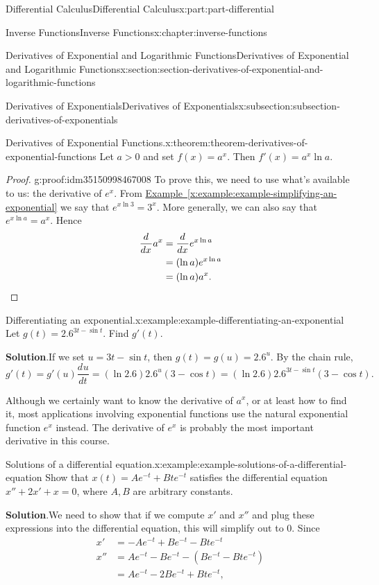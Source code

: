 \documentclass[twoside,10pt,]{book}
\newcommand{\blocktitlefont}{\relax}
\newcommand{\xreffont}{\relax}
\numberwithin{equation}{part}
\newcommand{\qedhere}{\relax}
\newcommand{\dv}[3][]{\dfrac{d^{#1} #2}{d #3^{#1}}}
\begin{document}
\begin{partptx}{Differential Calculus}{}{Differential Calculus}{}{}{x:part:part-differential}
\begin{chapterptx}{Inverse Functions}{}{Inverse Functions}{}{}{x:chapter:inverse-functions}
\begin{sectionptx}{Derivatives of Exponential and Logarithmic Functions}{}{Derivatives of Exponential and Logarithmic Functions}{}{}{x:section:section-derivatives-of-exponential-and-logarithmic-functions}
\begin{subsectionptx}{Derivatives of Exponentials}{}{Derivatives of Exponentials}{}{}{x:subsection:subsection-derivatives-of-exponentials}
\begin{theorem}{Derivatives of Exponential Functions.}{}{x:theorem:theorem-derivatives-of-exponential-functions}
%
Let \(a > 0\) and set \(f(x) = a^{x}\). Then \(f'(x) = a^{x}\ln a\).%
\end{theorem}
\begin{proof}{}{g:proof:idm35150998467008}
To prove this, we need to use what's available to us: the derivative of \(e^{x}\). From \hyperref[x:example:example-simplifying-an-exponential]{Example~{\xreffont\ref{x:example:example-simplifying-an-exponential}}} we say that \(e^{x\ln 3} = 3^{x}\). More generally, we can also say that \(e^{x\ln a} = a^{x}\). Hence%
\begin{align*}
\dv{}{x}a^{x} & = \dv{}{x}e^{x\ln a} \\
& = (\ln a)e^{x\ln a} \\
& = (\ln a)a^{x}. \qedhere
\end{align*}
%
\end{proof}
\begin{example}{Differentiating an exponential.}{x:example:example-differentiating-an-exponential}%
Let \(g(t) = 2.6^{3t - \sin t}\). Find \(g'(t)\).%
\par\smallskip%
\noindent\textbf{\blocktitlefont Solution}.\hypertarget{g:solution:idm35150998514624}{}\quad{}If we set \(u = 3t - \sin t\), then \(g(t) = g(u) = 2.6^{u}\). By the chain rule, \(g'(t) = g'(u)\dv{u}{t} = (\ln2.6)2.6^{u}(3-\cos t) = (\ln2.6)2.6^{3t-\sin t}(3-\cos t).\)%
\end{example}
Although we certainly want to know the derivative of \(a^{x}\), or at least how to find it, most applications involving exponential functions use the natural exponential function \(e^{x}\) instead. The derivative of \(e^{x}\) is probably the most important derivative in this course.%
\begin{example}{Solutions of a differential equation.}{x:example:example-solutions-of-a-differential-equation}%
Show that \(x(t) = Ae^{-t} + Bte^{-t}\) satisfies the differential equation \(x'' + 2x' + x = 0\), where \(A,B\) are arbitrary constants.%
\par\smallskip%
\noindent\textbf{\blocktitlefont Solution}.\hypertarget{g:solution:idm35150998509376}{}\quad{}We need to show that if we compute \(x'\) and \(x''\) and plug these expressions into the differential equation, this will simplify out to \(0\). Since%
\begin{align*}
x' & = -Ae^{-t} +Be^{-t} - Bte^{-t} \\
x'' & = Ae^{-t} - Be^{-t} - (Be^{-t} - Bte^{-t}) \\
& = Ae^{-t} - 2Be^{-t} + Bte^{-t}, 

\end{align*}
\end{example}
\end{subsectionptx}
\end{sectionptx}
\end{chapterptx}
\end{partptx}
\end{document}
